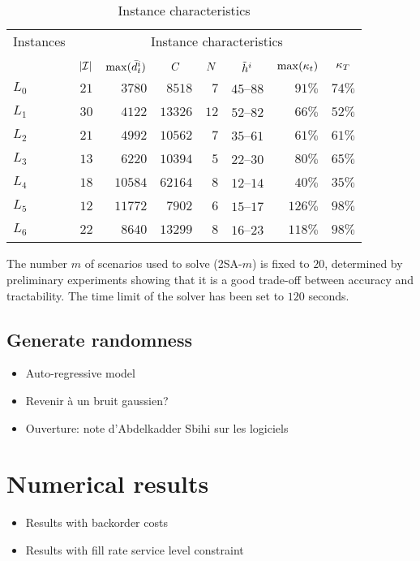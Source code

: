 \begin{table}[ht]
\begin{center}
\begin{tabular*}{\linewidth}{@{\extracolsep{\fill}}lrrrrrrr@{\extracolsep{\fill}}}
\hline
Instances &
\multicolumn{7}{c}{Instance characteristics}
\\\cline{2-8}
\\
& $\card{\REF}$
& $\max(\bar{d}_t^i)$
& \multicolumn{1}{c}{$C$}
& \multicolumn{1}{c}{$N$}
& \multicolumn{1}{c}{$\tilde{h}^i$}
& \multicolumn{1}{c}{$\max\bracket{\kappa_t}$}
& \multicolumn{1}{c}{$\kappa_{T}$}
\\\hline
$L_0$ & $21$ & $3780$ & $8518$ & $7$ & $45$--$88$ & $91\%$ & $74\%$
\\
$L_1$ & $30$ & $4122$ & $13326$ & $12$ & $52$--$82$ & $66\%$ & $52\%$
\\
$L_2$ & $21$ & $4992$ & $10562$ & $7$ & $35$--$61$ & $61\%$ & $61\%$
\\
$L_3$ & $13$ & $6220$ & $10394$ & $5$ & $22$--$30$ & $80\%$ & $65\%$
\\
$L_4$ & $18$ & $10584$ & $62164$ & $8$ & $12$--$14$ & $40\%$ & $35\%$
\\
$L_5$ & $12$ & $11772$ & $7902$ & $6$ & $15$--$17$ & $126\%$ & $98\%$
\\
$L_6$ & $22$ & $8640$ & $13299$ & $8$ & $16$--$23$ & $118\%$ & $98\%$
\\\hline
\end{tabular*}
\caption{Instance characteristics}
\label{tab:instances-characteristics}
\end{center}
\end{table}

The number $m$ of scenarios used to solve (2SA-$m$) is fixed to $20$, determined by preliminary experiments showing that it is a good trade-off between accuracy and tractability. The time limit of the solver has been set to $120$ seconds.




\subsection{Generate randomness}
\label{sec:PDP:numerical-experiments:dirichlet}

\begin{itemize}
  \item Auto-regressive model
  \item Revenir à un bruit gaussien?
  \item Ouverture: note d'Abdelkadder Sbihi sur les logiciels
\end{itemize}


\section{Numerical results}



\begin{itemize}
  \item Results with backorder costs
  \item Results with fill rate service level constraint
\end{itemize}
